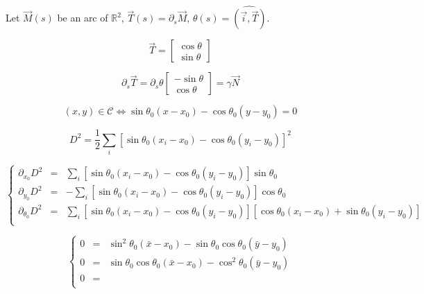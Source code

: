 \documentclass[aps,12pt]{revtex4}
\begin{document}
Let  $\vec{M}(s)$ be an arc of $\mathbb{R}^2$,  $\vec{T}(s) = \partial_s \vec{M}$, $\theta(s) = \widehat{(\vec{i},\vec{T})}$.

\begin{equation}
	\vec{T} = 
	\begin{bmatrix}
	\cos \theta\\
	\sin \theta
	\end{bmatrix}
\end{equation}

\begin{equation}
	\partial_s \vec{T} = \partial_s \theta 
	\begin{bmatrix}
	-\sin\theta\\
	\cos \theta
	\end{bmatrix}
 = \gamma \vec{N}
\end{equation}

\begin{equation}
(x,y) \in \mathcal{C} \iff \sin \theta_0 \left( x - x_0 \right) - \cos\theta_0 \left(y-y_0\right) = 0
\end{equation}

\begin{equation}
	D^2 = \dfrac{1}{2} \sum_i \left[\sin \theta_0 \left( x_i - x_0 \right) - \cos\theta_0 \left(y_i-y_0\right) \right]^2
\end{equation}

\begin{equation}
\left\lbrace
\begin{array}{rcl}
	\partial_{x_0} D^2      & = & \sum_i \left[\sin \theta_0 \left( x_i - x_0 \right) - \cos\theta_0 \left(y_i-y_0\right) \right]\sin\theta_0\\
	\partial_{y_0} D^2      & = & -\sum_i \left[\sin \theta_0 \left( x_i - x_0 \right) - \cos\theta_0 \left(y_i-y_0\right) \right]\cos\theta_0\\
	\partial_{\theta_0} D^2 & = &\sum_i \left[\sin \theta_0 \left( x_i - x_0 \right) - \cos\theta_0 \left(y_i-y_0\right) \right]\left[\cos \theta_0 \left( x_i - x_0 \right) + \sin\theta_0 \left(y_i-y_0\right) \right]\\
\end{array}
\right.
\end{equation}

\begin{equation}
\left\lbrace
\begin{array}{rcl}
	0 & = & \sin^2\theta_0 \left(\bar{x}-x_0\right) - \sin \theta_0 \cos\theta_0 \left(\bar{y}-y_0\right) \\
	0 & = & \sin \theta_0 \cos\theta_0 \left(\bar{x}-x_0\right) -  \cos^2\theta_0 \left(\bar{y}-y_0\right)\\
	0 & = & \\
\end{array}
\right.
\end{equation}
\end{document}
